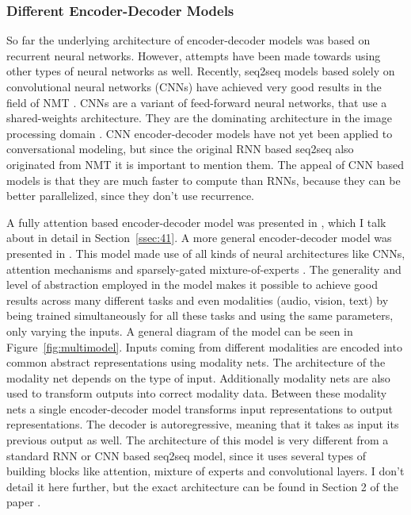 \documentclass[12pt]{article}
\begin{document}
\subsubsection{Different Encoder-Decoder Models} \label{sssec:diffencdec}
So far the underlying architecture of encoder-decoder models was based on recurrent neural networks. However, attempts have been made towards using other types of neural networks as well. Recently, seq2seq models based solely on convolutional neural networks (CNNs) have achieved very good results in the field of NMT \cite{Kaiser:2016,Kaiser:2017,ByteNet:2016,ConvS2S:2017}. CNNs are a variant of feed-forward neural networks, that use a shared-weights architecture. They are the dominating architecture in the image processing domain \cite{Imagenet:2012}. CNN encoder-decoder models have not yet been applied to conversational modeling, but since the original RNN based seq2seq also originated from NMT it is important to mention them. The appeal of CNN based models is that they are much faster to compute than RNNs, because they can be better parallelized, since they don't use recurrence.

A fully attention based encoder-decoder model was presented in \cite{Vaswani:2017}, which I talk about in detail in Section~\ref{ssec:41}. A more general encoder-decoder model was presented in \cite{Kaiser_one_model:2017}. This model made use of all kinds of neural architectures like CNNs, attention mechanisms and sparsely-gated mixture-of-experts \cite{MoE:2017}. The generality and level of abstraction employed in the model makes it possible to achieve good results across many different tasks and even modalities (audio, vision, text) by being trained simultaneously for all these tasks and using the same parameters, only varying the inputs. A general diagram of the model can be seen in Figure~\ref{fig:multimodel}. Inputs coming from different modalities are encoded into common abstract representations using modality nets. The architecture of the modality net depends on the type of input. Additionally modality nets are also used to transform outputs into correct modality data. Between these modality nets a single encoder-decoder model transforms input representations to output representations. The decoder is autoregressive, meaning that it takes as input its previous output as well. The architecture of this model is very different from a standard RNN or CNN based seq2seq model, since it uses several types of building blocks like attention, mixture of experts and convolutional layers. I don't detail it here further, but the exact architecture can be found in Section 2 of the paper \cite{Kaiser_one_model:2017}.
\end{document}
